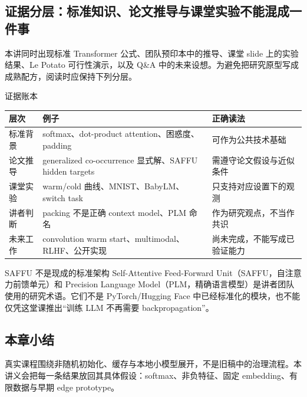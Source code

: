 \documentclass[a4paper]{article}
\begin{document}

\subsection{证据分层：标准知识、论文推导与课堂实验不能混成一件事}

本讲同时出现标准 Transformer 公式、团队预印本中的推导、课堂 slide 上的实验结果、Le Potato 可行性演示，以及 Q\&A 中的未来设想。为避免把研究原型写成成熟配方，阅读时应保持下列分层。

\begin{knowledgebox}{证据账本}
\begin{tabularx}{\textwidth}{L{0.17\textwidth} L{0.29\textwidth} X}
\toprule
层次 & 例子 & 正确读法 \\
\midrule
标准背景 & softmax、dot-product attention、困惑度、padding & 可作为公共技术基础 \\
论文推导 & generalized co-occurrence 显式解、SAFFU hidden targets & 需遵守论文假设与近似条件 \\
课堂实验 & warm/cold 曲线、MNIST、BabyLM、switch task & 只支持对应设置下的观测 \\
讲者判断 & packing 不是正确 context model、PLM 命名 & 作为研究观点，不当作共识 \\
未来工作 & convolution warm start、multimodal、RLHF、公开实现 & 尚未完成，不能写成已验证能力 \\
\bottomrule
\end{tabularx}
\end{knowledgebox}

\begin{warningbox}{SAFFU 不是现成的标准架构}
Self-Attentive Feed-Forward Unit（SAFFU，自注意力前馈单元）和 Precision Language Model（PLM，精确语言模型）是讲者团队使用的研究术语。它们不是 PyTorch/Hugging Face 中已经标准化的模块，也不能仅凭这堂课推出“训练 LLM 不再需要 backpropagation”。
\end{warningbox}

\subsection{本章小结}

真实课程围绕非随机初始化、缓存与本地小模型展开，不是旧稿中的治理流程。本讲义会把每一条结果放回其具体假设：softmax、非负特征、固定 embedding、有限数据与早期 edge prototype。
\end{document}
